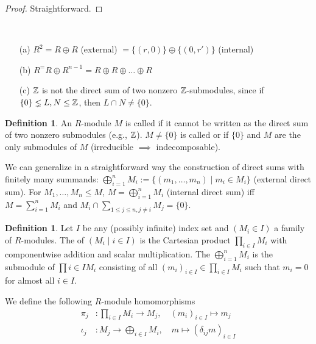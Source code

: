 \documentclass[11pt]{book}
\theoremstyle{definition}   \newtheorem{defn}[counter]{Definition} %
\DeclareMathOperator{\ra}{\rightarrow}   \DeclareMathOperator{\Poly}{\mathbf{P}}   \DeclareMathOperator{\spn}{\textnormal{span}}   \DeclareMathOperator{\aut}{\textnormal{Aut}}
\newcommand{\vs}{\vspace{8pt}}
\numberwithin{counter}{chapter}
\begin{document}
\begin{proof}
Straightforward.
\end{proof}

\vs

\begin{example*}\
\begin{enumerate}
\item[(a)] $R^2 = R \oplus R$ (external)  $= \{(r,0)\} \oplus \{(0,r')\}$ (internal)
\item[(b)] $R^ = R \oplus R^{n-1} = R \oplus R \oplus \dots \oplus R$
\item[(c)] $\operatorname{\mathbb{Z}}$ is not the direct sum of two nonzero $\operatorname{\mathbb{Z}}$-submodules, since if $\{0\} \lneq L,N \leq \operatorname{\mathbb{Z}}$, then $L \cap N \ne \{0\}$.
\end{enumerate}
\end{example*}

\vs

\begin{defn}
An $R$-module $M$ is called  if it cannot be written as the direct sum of two nonzero submodules (e.g., $\operatorname{\mathbb{Z}}$). $M \ne \{0\}$ is called  or  if $\{0\}$ and $M$ are the only submodules of $M$ (irreducible $\implies$ indecomposable).
\end{defn}

\vs

We can generalize in a straightforward way the construction of direct sums with finitely many summands: $\bigoplus_{i=1}^n M_i := \{(m_1,\dots,m_n) \mid m_i \in M_i\}$ (external direct sum). For $M_1,\dots,M_n \leq M$, $M = \bigoplus_{i=1}^n M_i$ (internal direct sum) iff $M = \sum_{i=1}^n M_i$ and $M_i \cap \sum_{1 \leq j \leq n, j \ne i} M_j = \{0\}$.

\vs

\begin{defn}
Let $I$ be any (possibly infinite) index set and $(M_i \in I)$ a family of $R$-modules. The  of $(M_i \mid i \in I)$ is the Cartesian product $\prod_{i \in I} M_i$ with componentwise addition and scalar multiplication. The  $\bigoplus_{i=1}^n M_i$ is the submodule of $\prod{i \in I} M_i$ consisting of all $(m_i)_{i \in I} \in \prod_{i \in I} M_i$ such that $m_i = 0$ for almost all $i \in I$.
\end{defn}

\vs

We define the following $R$-module homomorphisms
\begin{align*}
\pi_j & : \prod_{i \in I} M_i \ra M_j, \quad (m_i)_{i \in I} \mapsto m_j \\
\iota_j &: M_j \ra \bigoplus_{i \in I} M_i,  \quad m \mapsto (\delta_{ij}m)_{i \in I}
\end{align*}
\end{document}
